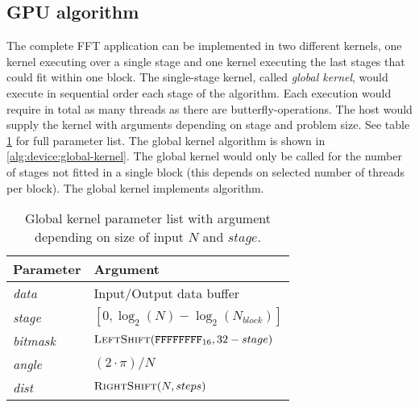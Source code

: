 \subsection{GPU algorithm}

The complete FFT application can be implemented in two different kernels, one kernel executing over a single stage and one kernel executing the last stages that could fit within one block. The single-stage kernel, called \emph{global kernel}, would execute in sequential order each stage of the algorithm. Each execution would require in total as many threads as there are butterfly-operations. The host would supply the kernel with arguments depending on stage and problem size. See table \ref{tab:global-kernel} for full parameter list. The global kernel algorithm is shown in \ref{alg:device:global-kernel}. The global kernel would only be called for the number of stages not fitted in a single block (this depends on selected number of threads per block). The global kernel implements {\CTALG} algorithm.

\begin{table}
	\centering
	\begin{tabular}{|l|l|}
		\hline
		Parameter & Argument \\ \hline
		\textit{data} & Input/Output data buffer \\ \hline
		\textit{stage} & $[0,\log_{2}(N) - \log_{2}(N_{block})]$ \\ \hline
		\textit{bitmask} & $\Call{LeftShift}{\texttt{FFFFFFFF}_{16}, 32 - stage}$ \\ \hline
		\textit{angle} & $(2 \cdot \pi)/N$ \\ \hline
		\textit{dist} & $\Call{RightShift}{N, steps}$ \\ \hline		
	\end{tabular}
	\caption{Global kernel parameter list with argument depending on size of input $N$ and $stage$.}
	\label{tab:global-kernel}
\end{table}

